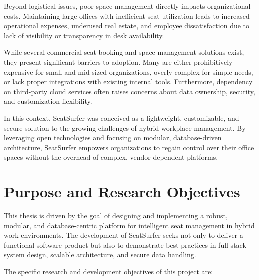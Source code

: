\documentclass[12pt,a4paper]{report} %
\begin{document}
Beyond logistical issues, poor space management directly impacts organizational costs. Maintaining large offices with inefficient seat utilization leads to increased operational expenses, underused real estate, and employee dissatisfaction due to lack of visibility or transparency in desk availability.

While several commercial seat booking and space management solutions exist, they present significant barriers to adoption. Many are either prohibitively expensive for small and mid-sized organizations, overly complex for simple needs, or lack proper integrations with existing internal tools. Furthermore, dependency on third-party cloud services often raises concerns about data ownership, security, and customization flexibility.

In this context, SeatSurfer was conceived as a lightweight, customizable, and secure solution to the growing challenges of hybrid workplace management. By leveraging open technologies and focusing on modular, database-driven architecture, SeatSurfer empowers organizations to regain control over their office spaces without the overhead of complex, vendor-dependent platforms.

\section*{Purpose and Research Objectives}

This thesis is driven by the goal of designing and implementing a robust, modular, and database-centric platform for intelligent seat management in hybrid work environments. The development of SeatSurfer seeks not only to deliver a functional software product but also to demonstrate best practices in full-stack system design, scalable architecture, and secure data handling.

The specific research and development objectives of this project are:
\end{document}
